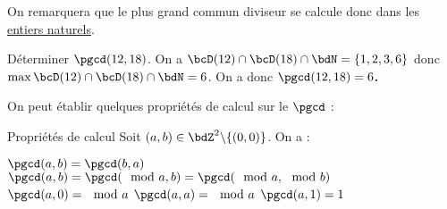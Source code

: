 \documentclass[a4paper,french,bookmarks]{article}
\begin{document}
On remarquera que le plus grand commun diviseur se calcule donc dans les \underline{entiers naturels}.

\begin{example}{}{}
    Déterminer $\pgcd(12, 18)$.
    \tcblower
    On a $\bcD(12) \cap \bcD(18) \cap \bdN = \{1, 2, 3, 6\}$ donc $\max{\bcD(12) \cap \bcD(18) \cap \bdN} = 6$. On a donc \bf{$\pgcd(12, 18) = 6$}.
\end{example}

On peut établir quelques propriétés de calcul sur le $\pgcd$ :

\begin{property}{Propriétés de calcul}{}
    Soit $(a, b) \in \bdZ^2 \backslash \{(0, 0)\}$. On a :
    \begin{multicols}{2}
        \begin{enumerate}
            \ithand $\pgcd(a, b) = \pgcd(b, a)$
            \ithand $\pgcd(a, b) = \pgcd(\mod{a}, b) = \pgcd(\mod{a}, \mod{b})$
            \ithand $\pgcd(a, 0) = \mod{a}$
            \ithand $\pgcd(a, a) = \mod{a}$
            \ithand $\pgcd(a, 1) = 1$
        \end{enumerate}
    \end{multicols}
\end{property}
\end{document}
